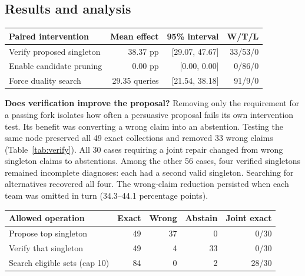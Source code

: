 \documentclass[11pt,letterpaper]{article}
\begin{document}
\subsection{Results and analysis}
\begin{center}\begin{minipage}{\linewidth}\centering
{}\label{tab:primary}
\small\begin{tabular}{lrrr}
\toprule
Paired intervention & Mean effect & 95\% interval & W/T/L \\
\midrule
Verify proposed singleton & 38.37 pp & [29.07, 47.67] & 33/53/0 \\
Enable candidate pruning & 0.00 pp & [0.00, 0.00] & 0/86/0 \\
Force duality search & 29.35 queries & [21.54, 38.18] & 91/9/0 \\
\bottomrule\end{tabular}
\end{minipage}\end{center}

\textbf{Does verification improve the proposal?} Removing only the requirement for a passing fork isolates how often a persuasive proposal fails its own intervention test. Its benefit was converting a wrong claim into an abstention. Testing the same node preserved all 49 exact collections and removed 33 wrong claims (Table~\ref{tab:verify}). All 30 cases requiring a joint repair changed from wrong singleton claims to abstentions. Among the other 56 cases, four verified singletons remained incomplete diagnoses: each had a second valid singleton. Searching for alternatives recovered all four. The wrong-claim reduction persisted when each team was omitted in turn (34.3--44.1 percentage points).

\begin{center}\begin{minipage}{\linewidth}\centering
{}\label{tab:verify}
\small\begin{tabular}{lrrrr}
\toprule
Allowed operation & Exact & Wrong & Abstain & Joint exact \\
\midrule
Propose top singleton & 49 & 37 & 0 & 0/30 \\
Verify that singleton & 49 & 4 & 33 & 0/30 \\
Search eligible sets (cap 10) & 84 & 0 & 2 & 28/30 \\
\bottomrule\end{tabular}
\end{minipage}\end{center}
\end{document}
